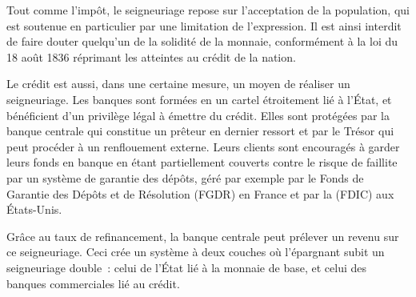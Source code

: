 Tout comme l'impôt, le seigneuriage repose sur l'acceptation de la population, qui est soutenue en particulier par une limitation de l'expression. Il est ainsi interdit de faire douter quelqu'un de la solidité de la monnaie, conformément à la loi du 18 août 1836 réprimant les atteintes au crédit de la nation. %


Le crédit est aussi, dans une certaine mesure, un moyen de réaliser un seigneuriage. Les banques sont formées en un cartel étroitement lié à l'État, et bénéficient d'un privilège légal à émettre du crédit. Elles sont protégées par la banque centrale qui constitue un prêteur en dernier ressort et par le Trésor qui peut procéder à un renflouement externe. Leurs clients sont encouragés à garder leurs fonds en banque en étant partiellement couverts contre le risque de faillite par un système de garantie des dépôts, géré par exemple par le Fonds de Garantie des Dépôts et de Résolution (FGDR) en France et par la  (FDIC) aux États-Unis.

Grâce au taux de refinancement, la banque centrale peut prélever un revenu sur ce seigneuriage. Ceci crée un système à deux couches où l'épargnant subit un seigneuriage double~: celui de l'État lié à la monnaie de base, et celui des banques commerciales lié au crédit.

